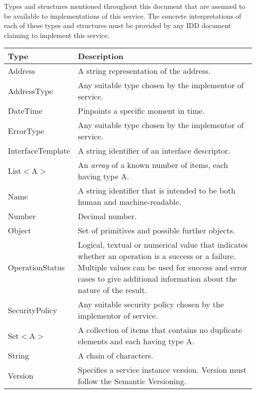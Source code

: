 \documentclass[a4paper]{arrowhead}
\newcommand{\pdef}[1]{{\textcolor{ArrowheadGrey}{#1\label{sec:model:primitives:#1}\label{sec:model:primitives:#1s}\label{sec:model:primitives:#1es}}}}
\begin{document}
Types and structures mentioned throughout this document that are assumed to be available to implementations of this service.
The concrete interpretations of each of these types and structures must be provided by any IDD document claiming to implement this service.


\begin{table}[ht!]
\begin{tabularx}{\textwidth}{| p{3cm} | X |} \hline
\rowcolor{gray!33} Type & Description \\ \hline
\pdef{Address}          & A string representation of the address. \\ \hline
\pdef{AddressType}      & Any suitable type chosen by the implementor of service. \\ \hline
\pdef{DateTime}         & Pinpoints a specific moment in time. \\ \hline
\pdef{ErrorType}        & Any suitable type chosen by the implementor of service. \\ \hline
\pdef{InterfaceTemplate}& A string identifier of an interface descriptor. \\ \hline
\pdef{List}$<$A$>$      & An \textit{array} of a known number of items, each having type A. \\ \hline
\pdef{Name}             & A string identifier that is intended to be both human and machine-readable. \\ \hline
\pdef{Number}           & Decimal number. \\ \hline
\pdef{Object}           & Set of primitives and possible further objects. \\ \hline
\pdef{OperationStatus}  & Logical, textual or numerical value that indicates whether an operation is a success or a failure. Multiple values can be used for success and error cases to give additional information about the nature of the result. \\ \hline
\pdef{SecurityPolicy}   & Any suitable security policy chosen by the implementor of service. \\ \hline
\pdef{Set}$<$A$>$       & A collection of items that contains no duplicate elements and each having type A. \\ \hline
\pdef{String}           & A chain of characters. \\ \hline
\pdef{Version}          & Specifies a service instance version. Version must follow the Semantic Versioning.  \\ \hline
\end{tabularx}
\end{table}
\end{document}
